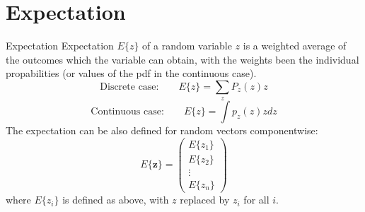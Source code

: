 \documentclass{beamer}
\begin{document}
%
%
%
%
%
%
%

\section{Expectation}

\begin{frame}{Expectation}
  Expectation $E\{z\}$ of a random variable $z$ is a weighted average of the
  outcomes which the variable can obtain, with the weights been the individual
  propabilities (or values of the pdf in the continuous case).
  \[
  \text{Discrete case:} \qquad
  E\{z\} = \sum_{z} P_{z}(z)z
  \]
  \[
  \text{Continuous case:} \qquad
  E\{z\} = \int p_{z}(z)zdz
  \]
  The expectation can be also defined for random vectors componentwise:
  \[
  E\{\mathbf{z}\} =
  \begin{pmatrix} E\{z_1\} \\ E\{z_2\} \\ \vdots \\ E\{z_n\} \end{pmatrix}
  \]
  where $E\{z_i\}$ is defined as above, with $z$ replaced by $z_i$ for all $i$.
\end{frame}
\end{document}
